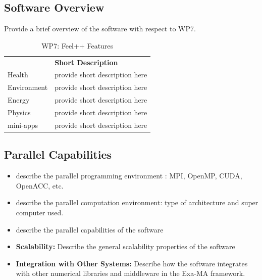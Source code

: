 \subsection{Software Overview}
\label{sec:WP7:Feel++:summary}

Provide a brief overview of the software with respect to WP7.

\begin{table}[!ht]
    \centering
    {
        \setlength{\parindent}{0pt}
        \def\arraystretch{1.25}
        {
            \fontsize{9}{11}\selectfont
            \begin{tabular}{!{\color{numpexgray}\vrule}p{.25\linewidth}!{\color{numpexgray}\vrule}p{.6885\linewidth}!{\color{numpexgray}\vrule}}

     &  {\rule{0pt}{2.5ex}\color{white}\bf Short Description }\\

    Health & provide short description here \\
    Environment & provide short description here \\
    Energy & provide short description here \\
    Physics & provide short description here \\
    mini-apps & provide short description here \\
\end{tabular}
        }
    }
    \caption{WP7: Feel++ Features}
\end{table}


\subsection{Parallel Capabilities}
\label{sec:WP7:Feel++:performances}


\begin{itemize}
    \item describe the parallel programming  environment : MPI, OpenMP, CUDA, OpenACC, etc.
    \item describe the parallel computation environment: type of architecture and super computer used.
    \item describe the parallel capabilities of the software
    \item \textbf{Scalability:} Describe the general scalability properties of the software
    \item \textbf{Integration with Other Systems:} Describe how the software integrates with other numerical libraries and middleware in the Exa-MA framework.
\end{itemize}


